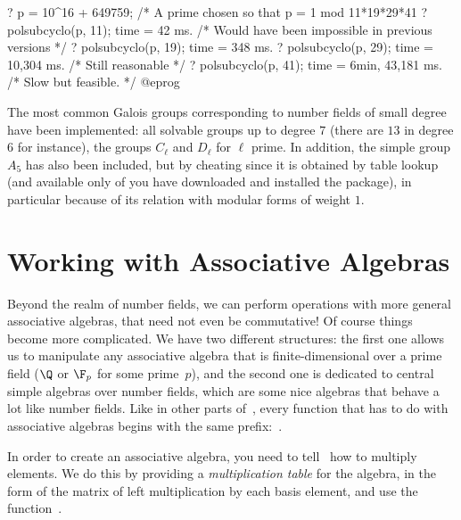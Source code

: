\bprog
? p = 10^16 + 649759; /* A prime chosen so that p = 1 mod 11*19*29*41
? polsubcyclo(p, 11);
time = 42 ms. /* Would have been impossible in previous versions */
? polsubcyclo(p, 19);
time = 348 ms.
? polsubcyclo(p, 29);
time = 10,304 ms. /* Still reasonable */
? polsubcyclo(p, 41);
time = 6min, 43,181 ms. /* Slow but feasible. */
@eprog

\medskip

The most common Galois groups corresponding to number fields of small
degree have been implemented: all solvable groups up to degree $7$
(there are $13$ in degree $6$ for instance), the groups $C_{\ell}$ and
$D_{\ell}$ for $\ell$ prime. In addition, the simple group $A_5$ has also
been included, but by cheating since it is obtained by table lookup
(and available only of you have downloaded and installed the
 package), in particular because of its relation with
modular forms of weight $1$.

\section{Working with Associative Algebras}

Beyond the realm of number fields, we can perform operations with more
general associative algebras, that need not even be commutative! Of course
things become more complicated. We have two different structures: the first
one allows us to manipulate any associative algebra that is
finite-dimensional over a prime field ($\Q$ or $\F_p$ for some prime~$p$),
and the second one is dedicated to central simple algebras over number
fields, which are some nice algebras that behave a lot like number fields.
Like in other parts of~, every function that has to do with
associative algebras begins with the same prefix:~.


In order to create an associative algebra, you need to tell~ how to
multiply elements. We do this by providing a \emph{multiplication table} for the
algebra, in the form of the matrix of left multiplication by each basis element,
and use the function~.

